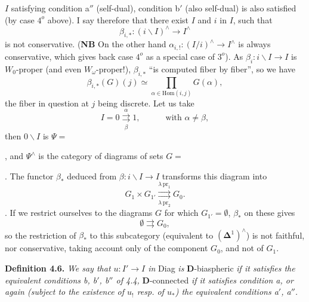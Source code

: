 \documentclass[11pt]{article}
\newcommand{\printedpage}[1]{\marginpar{\footnotesize p.~#1}}
\newcommand{\msp}[1]{\marginpar{\footnotesize [#1]}}
\newcommand{\D}{\mathbf{D}}
\begin{document}
\printedpage{39}

$I$ satisfying condition a$''$ (self-dual), condition b$'$ (also self-dual) is also satisfied (by case $4^o$ above). I say therefore that there exist $I$ and $i$ in $I$, such that
\[
\beta_{i,*} : (i\backslash I)^\wedge \longrightarrow I^\wedge
\]
is not conservative. (\textbf{NB} On the other hand $\alpha_{i,!} : (I/i)^\wedge \longrightarrow I^\wedge$ is always conservative, which gives back case $4^o$ as a special case of $3^o$). As $\beta_i : i\backslash I \longrightarrow I$ is $W_0$-proper (and even $W_\omega$-proper!), $\beta_{i,*}$ ``is computed fiber by fiber'', so we have
\msp{page 64}
\[
\beta_{i,*}(G)(j) \simeq \prod_{\alpha\in\mathrm{Hom}(i,j)} G(\alpha),
\]
the fiber in question at $j$ being discrete. Let us take
\[
I = 0 \underset{\beta}{\overset{\alpha}{\rightrightarrows}} 1, \qquad\quad \text{with } \alpha \neq \beta,
\]
then $0\backslash I$ is $\Psi = {}$, and $\Psi^\wedge$ is the category of diagrams of sets $G = {}$. The functor $\beta_*$ deduced from $\beta : i\backslash I \longrightarrow I$ transforms this diagram into
\[
G_1 \times G_{1'} \underset{\lambda\,\mathrm{pr}_2}{\overset{\lambda\,\mathrm{pr}_1}{\rightrightarrows}} G_0.
\]
. If we restrict ourselves to the diagrams $G$ for which $G_{1'} = \emptyset$, $\beta_*$ on these gives
\[
\emptyset \rightrightarrows G_0,
\]
so the restriction of $\beta_*$ to this subcategory (equivalent to $(\boldsymbol{\Delta}^1)^\wedge$) is not faithful, nor conservative, taking account only of the component $G_0$, and not of $G_1$.

\msp{page 63bis}

\textbf{Definition 4.6.} \textit{We say that $u : I' \longrightarrow I$ in} Diag \textit{is} $\D$-biaspheric \textit{if it satisfies the equivalent conditions b, b$'$, b$''$ of 4.4,} $\D$-connected \textit{if it satisfies condition a, or again (subject to the existence of $u_!$ resp. of $u_*$) the equivalent conditions a$'$, a$''$.} %
\end{document}
